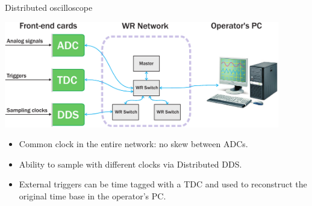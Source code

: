 \documentclass[compress,red]{beamer}
\begin{document}
\begin{frame}{Distributed oscilloscope}
  \begin{center}
    \includegraphics[width=0.9\textwidth]{applications/distr_oscill.pdf}
    \end{center}
    \begin{block}{}
      \begin{itemize}
      \item Common clock in the entire network: no skew between ADCs.
      \item Ability to sample with different clocks via Distributed DDS.
      \item External triggers can be time tagged with a TDC and used to reconstruct the original time base in the operator's PC.
      \end{itemize}
    \end{block}
\end{frame}
\end{document}
